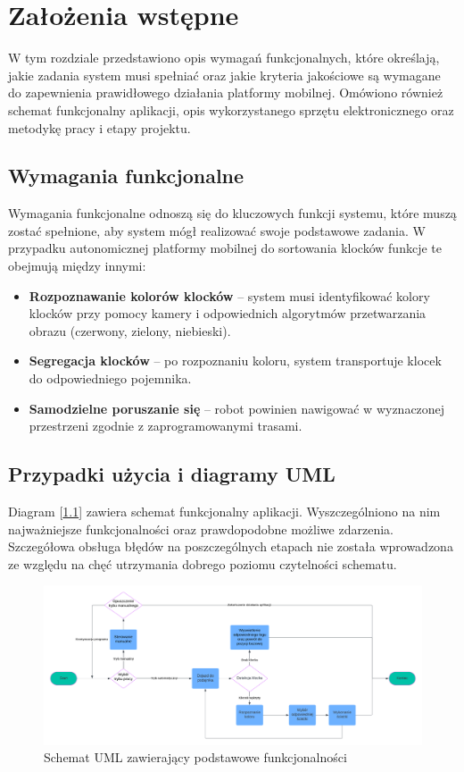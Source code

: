 \chapter{Założenia wstępne}
\label{ch:zalozenia-wstepne}

W tym rozdziale przedstawiono opis wymagań funkcjonalnych, które określają, jakie zadania system musi spełniać oraz jakie kryteria jakościowe są wymagane do zapewnienia prawidłowego działania platformy mobilnej. Omówiono również schemat funkcjonalny aplikacji, opis wykorzystanego sprzętu elektronicznego oraz metodykę pracy i etapy projektu.


\section{Wymagania funkcjonalne}
Wymagania funkcjonalne odnoszą się do kluczowych funkcji systemu, które muszą zostać spełnione, aby system mógł realizować swoje podstawowe zadania. W przypadku autonomicznej platformy mobilnej do sortowania klocków funkcje te obejmują między innymi:
\begin{itemize}
    \item \textbf{Rozpoznawanie kolorów klocków} – system musi identyfikować kolory klocków przy pomocy kamery i odpowiednich algorytmów przetwarzania obrazu (czerwony, zielony, niebieski).
    \item \textbf{Segregacja klocków} – po rozpoznaniu koloru, system transportuje klocek do odpowiedniego pojemnika.
    \item \textbf{Samodzielne poruszanie się} – robot powinien nawigować w wyznaczonej przestrzeni zgodnie z zaprogramowanymi trasami.
\end{itemize}

\section{Przypadki użycia i diagramy UML}

Diagram [\ref{rys1:schemat_uml}] zawiera schemat funkcjonalny aplikacji. Wyszczególniono na nim najważniejsze funkcjonalności oraz prawdopodobne możliwe zdarzenia. Szczegółowa obsługa błędów na poszczególnych etapach nie została wprowadzona ze względu na chęć utrzymania dobrego poziomu czytelności schematu. 

\begin{figure}[h]
    \centering
    \includegraphics[width=1.0\textwidth]{./graf/uml.png}
    \caption{Schemat UML zawierający podstawowe funkcjonalności}
    \label{rys1:schemat_uml}
\end{figure}

